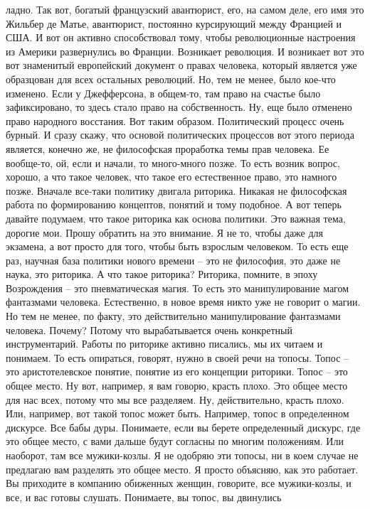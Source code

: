 ладно. Так вот, богатый французский авантюрист, его, на самом деле, его имя это
Жильбер де Матье, авантюрист, постоянно курсирующий между Францией и США. И вот
он активно способствовал тому, чтобы революционные настроения из Америки
развернулись во Франции. Возникает революция. И возникает вот это вот знаменитый
европейский документ о правах человека, который является уже образцован для всех
остальных революций. Но, тем не менее, было кое-что изменено. Если у
Джефферсона, в общем-то, там право на счастье было зафиксировано, то здесь стало
право на собственность. Ну, еще было отменено право народного восстания. Вот
таким образом. Политический процесс очень бурный. И сразу скажу, что основой
политических процессов вот этого периода является, конечно же, не философская
проработка темы прав человека. Ее вообще-то, ой, если и начали, то много-много
позже. То есть возник вопрос, хорошо, а что такое человек, что такое его
естественное право, это намного позже. Вначале все-таки политику двигала
риторика. Никакая не философская работа по формированию концептов, понятий и
тому подобное. А вот теперь давайте подумаем, что такое риторика как основа
политики. Это важная тема, дорогие мои. Прошу обратить на это внимание. Я не то,
чтобы даже для экзамена, а вот просто для того, чтобы быть взрослым человеком.
То есть еще раз, научная база политики нового времени – это не философия, это
даже не наука, это риторика. А что такое риторика? Риторика, помните, в эпоху
Возрождения – это пневматическая магия. То есть это манипулирование магом
фантазмами человека. Естественно, в новое время никто уже не говорит о магии. Но
тем не менее, по факту, это действительно манипулирование фантазмами человека.
Почему? Потому что вырабатывается очень конкретный инструментарий. Работы по
риторике активно писались, мы их читаем и понимаем. То есть опираться, говорят,
нужно в своей речи на топосы. Топос – это аристотелевское понятие, понятие из
его концепции риторики. Топос – это общее место. Ну вот, например, я вам говорю,
красть плохо. Это общее место для нас всех, потому что мы все разделяем. Ну,
действительно, красть плохо. Или, например, вот такой топос может быть.
Например, топос в определенном дискурсе. Все бабы дуры. Понимаете, если вы
берете определенный дискурс, где это общее место, с вами дальше будут согласны
по многим положениям. Или наоборот, там все мужики-козлы. Я не одобряю эти
топосы, ни в коем случае не предлагаю вам разделять это общее место. Я просто
объясняю, как это работает. Вы приходите в компанию обиженных женщин, говорите,
все мужики-козлы, и все, и вас готовы слушать. Понимаете, вы топос, вы двинулись
